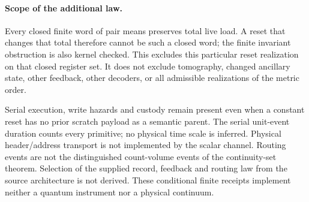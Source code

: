 \paragraph{Scope of the additional law.}
Every closed finite word of pair means preserves total live load.  A reset
that changes that total therefore cannot be such a closed word; the finite
invariant obstruction is also kernel checked.  This excludes this particular
reset realization on that closed register set.  It does not exclude
tomography, changed ancillary state, other feedback, other decoders, or all
admissible realizations of the metric order.

Serial execution, write hazards and custody remain present even when a
constant reset has no prior scratch payload as a semantic parent.  The
serial unit-event duration counts every primitive; no physical time scale
is inferred.  Physical header/address transport is not implemented by the
scalar channel.  Routing events are not the distinguished count-volume
events of the continuity-set theorem.  Selection of the supplied record,
feedback and routing law from the source architecture is not derived.
These conditional finite receipts implement neither a quantum instrument
nor a physical continuum.
